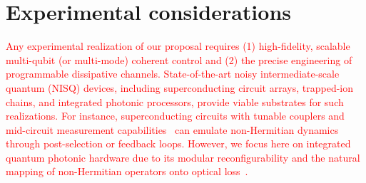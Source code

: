 \documentclass[longbibliography, aps, prx, amsmath, amssymb, amsfonts, twocolumn,superscriptaddress, footinbib]{revtex4-1}
\begin{document}
	\section{Experimental considerations}
	\textcolor{red}{
	Any experimental realization of our proposal requires (1) high-fidelity, scalable multi-qubit (or multi-mode) coherent control and (2) the precise engineering of programmable dissipative channels. State-of-the-art noisy intermediate-scale quantum (NISQ) devices, including superconducting circuit arrays, trapped-ion chains, and integrated photonic processors, provide viable substrates for such realizations. For instance, superconducting circuits with tunable couplers and mid-circuit measurement capabilities~\cite{guo2021observation, preskill2018quantum, wu2021strong} can emulate non-Hermitian dynamics through post-selection or feedback loops. However, we focus here on integrated quantum photonic hardware due to its modular reconfigurability and the natural mapping of non-Hermitian operators onto optical loss~\cite{zhong2020quantum, madsen2022quantum, zhu2024dynamically, zhu2024large}. 
	}
\end{document}
